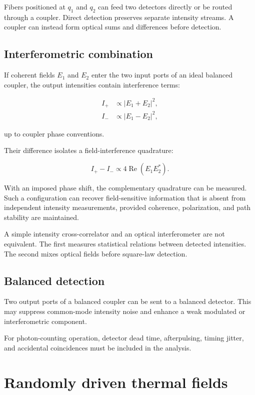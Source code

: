 \documentclass[11pt,letterpaper]{article}
\begin{document}
Fibers positioned at $q_1$ and $q_2$ can feed two detectors directly or be
routed through a coupler. Direct detection preserves separate intensity
streams. A coupler can instead form optical sums and differences before
detection.

\subsection{Interferometric combination}

If coherent fields $E_1$ and $E_2$ enter the two input ports of an ideal
balanced coupler, the output intensities contain interference terms:

\begin{align}
    I_+ &\propto |E_1+E_2|^2,\\
    I_- &\propto |E_1-E_2|^2,
\end{align}

up to coupler phase conventions.

Their difference isolates a field-interference quadrature:

\begin{equation}
    I_+-I_-
    \propto
    4\operatorname{Re}\left(E_1E_2^*\right).
\end{equation}

With an imposed phase shift, the complementary quadrature can be measured.
Such a configuration can recover field-sensitive information that is absent
from independent intensity measurements, provided coherence, polarization,
and path stability are maintained.

A simple intensity cross-correlator and an optical interferometer are not
equivalent. The first measures statistical relations between detected
intensities. The second mixes optical fields before square-law detection.

\subsection{Balanced detection}

Two output ports of a balanced coupler can be sent to a balanced detector.
This may suppress common-mode intensity noise and enhance a weak modulated
or interferometric component.

For photon-counting operation, detector dead time, afterpulsing, timing
jitter, and accidental coincidences must be included in the analysis.

\section{Randomly driven thermal fields}
\end{document}
